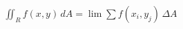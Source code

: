 \documentclass[preview]{standalone}
\begin{document}
\begin{align*}
\iint_{R}  f(x,y) \, dA = \lim \sum  f(x_i,y_j) \,  \Delta A
\end{align*}
\end{document}
